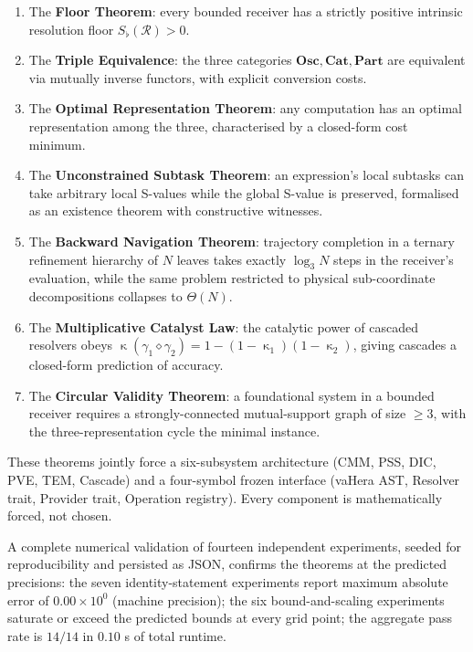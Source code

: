 \documentclass[twocolumn,a4paper]{article}
\DeclareMathOperator{\catpow}{\kappa}
\newcommand{\receiver}{\mathcal{R}}
\newcommand{\Sfloor}{S_{\flat}}
\begin{document}
\begin{enumerate}[nosep,leftmargin=*]
\item The \textbf{Floor Theorem}: every bounded receiver has a strictly positive intrinsic resolution floor $\Sfloor(\receiver)>0$.
\item The \textbf{Triple Equivalence}: the three categories $\mathbf{Osc},\mathbf{Cat},\mathbf{Part}$ are equivalent via mutually inverse functors, with explicit conversion costs.
\item The \textbf{Optimal Representation Theorem}: any computation has an optimal representation among the three, characterised by a closed-form cost minimum.
\item The \textbf{Unconstrained Subtask Theorem}: an expression's local subtasks can take arbitrary local S-values while the global S-value is preserved, formalised as an existence theorem with constructive witnesses.
\item The \textbf{Backward Navigation Theorem}: trajectory completion in a ternary refinement hierarchy of $N$ leaves takes exactly $\log_{3}N$ steps in the receiver's evaluation, while the same problem restricted to physical sub-coordinate decompositions collapses to $\Theta(N)$.
\item The \textbf{Multiplicative Catalyst Law}: the catalytic power of cascaded resolvers obeys $\catpow(\gamma_{1}\diamond\gamma_{2})=1-(1-\catpow_{1})(1-\catpow_{2})$, giving cascades a closed-form prediction of accuracy.
\item The \textbf{Circular Validity Theorem}: a foundational system in a bounded receiver requires a strongly-connected mutual-support graph of size $\geq 3$, with the three-representation cycle the minimal instance.
\end{enumerate}

These theorems jointly force a six-subsystem architecture (CMM, PSS, DIC, PVE, TEM, Cascade) and a four-symbol frozen interface (vaHera AST, Resolver trait, Provider trait, Operation registry). Every component is mathematically forced, not chosen.

A complete numerical validation of fourteen independent experiments, seeded for reproducibility and persisted as JSON, confirms the theorems at the predicted precisions: the seven identity-statement experiments report maximum absolute error of $0.00 \times 10^{0}$ (machine precision); the six bound-and-scaling experiments saturate or exceed the predicted bounds at every grid point; the aggregate pass rate is $14/14$ in $0.10$ s of total runtime.
\end{document}
